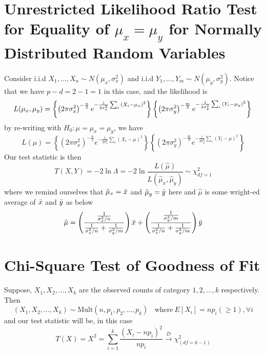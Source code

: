 \documentclass{article}
\begin{document}
\section{Unrestricted Likelihood Ratio Test for Equality of $\mu_x = \mu_y$ for Normally Distributed Random Variables}
Consider i.i.d $X_1,\ldots,X_n \sim N(\mu_x, \sigma_x^2)$ and i.i.d $Y_1,\ldots,Y_m \sim N(\mu_y, \sigma_y^2)$. Notice that we have $p-d = 2 - 1 = 1$ in this case, and the likelihood is
\begin{equation*}
    L(\mu_x, \mu_y) = \left\{\left(2\pi \sigma_x^2\right)^{-\frac{n}{2}}e^{-\frac{1}{2\sigma_x^2}\sum_i{\left(X_i - \mu_x\right)^2}}\right\} \left\{\left(2\pi \sigma_y^2\right)^{-\frac{m}{2}}e^{-\frac{1}{2\sigma_y^2}\sum_i{\left(Y_i - \mu_y\right)^2}}\right\} \\
\end{equation*}    
by re-writing with $H_0: \mu = \mu_x = \mu_y$, we have
\begin{equation*}
    L(\mu) = \left\{\left(2\pi \sigma_x^2\right)^{-\frac{n}{2}}e^{-\frac{1}{2\sigma_x^2}\sum_i{\left(X_i - \mu\right)^2}}\right\} \left\{\left(2\pi \sigma_y^2\right)^{-\frac{m}{2}}e^{-\frac{1}{2\sigma_y^2}\sum_i{\left(Y_i - \mu\right)^2}}\right\}
\end{equation*}
Our test statistic is then
\begin{equation*}
    T(X,Y) = -2 \ln \Lambda = -2 \ln \frac{L(\hat{\mu})}{L(\hat{\mu}_x, \hat{\mu}_y)} \sim \chi^2_{df = 1}
\end{equation*}
where we remind ourselves that $\hat{\mu}_x = \Bar{x}$ and $\hat{\mu}_y = \Bar{y}$ here and $\hat{\mu}$ is some wright-ed average of $\Bar{x}$ and $\Bar{y}$ as below
\begin{equation*}
    \hat{\mu} = \left( \frac{\frac{1}{\sigma^2_x/n}}{ \frac{1}{\sigma^2_x/n} + \frac{1}{\sigma^2_y/m} }\right)\Bar{x} + \left( \frac{\frac{1}{\sigma^2_y/m}}{ \frac{1}{\sigma^2_x/n} + \frac{1}{\sigma^2_y/m} }\right)\Bar{y}
\end{equation*}

\section{Chi-Square Test of Goodness of Fit}
Suppose, $X_1, X_2, \ldots, X_k$ are the observed counts of category $1, 2, \ldots, k$ respectively. Then
\begin{equation*}
    (X_1, X_2, \ldots, X_k) \sim \text{Mult}(n, p_1, p_2, \ldots, p_k)~~~~\text{where}~E[X_i] = np_i (\geq 1), \forall i
\end{equation*}
and our test statistic will be, in this case
\begin{equation*}
    T(X) = X^2 = \sum_{i = 1}^k \frac{\left(X_i - np_i\right)^2}{np_i} \xrightarrow{D} \chi^2_{(df=k-1)}
\end{equation*}
\end{document}

